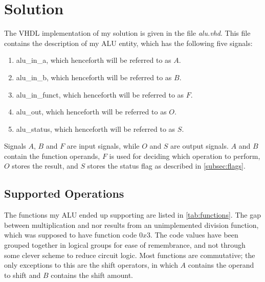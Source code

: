 \documentclass{article}
\begin{document}
\section{Solution}
\label{sec:solution}
The VHDL implementation of my solution is given in the file \emph{alu.vhd}. This file contains the description of my ALU entity, which has the following five signals:

\begin{enumerate} 
\item alu\_in\_a, which henceforth will be referred to as $A$.
\item alu\_in\_b, which henceforth will be referred to as $B$.
\item alu\_in\_funct, which henceforth will be referred to as $F$.
\item alu\_out, which henceforth will be referred to as $O$.
\item alu\_status, which henceforth will be referred to as $S$.
\end{enumerate}

Signals $A$, $B$ and $F$ are input signals, while $O$ and $S$ are output signals. $A$ and $B$ contain the function operands, $F$ is used for deciding which operation to perform, $O$ stores the result, and $S$ stores the status flag as described in \autoref{subsec:flags}.

\subsection{Supported Operations}
\label{subsec:ops}
The functions my ALU ended up supporting are listed in \autoref{tab:functions}. The gap between multiplication and nor results from an unimplemented division function, which was supposed to have function code $0x3$. The code values have been grouped together in logical groups for ease of remembrance, and not through some clever scheme to reduce circuit logic. Most functions are commutative; the only exceptions to this are the shift operators, in which $A$ contains the operand to shift and $B$ contains the shift amount.
\end{document}
